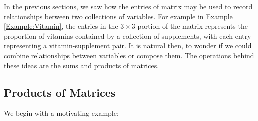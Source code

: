 In the previous sections, we saw how the entries of matrix may be used to record relationships between two collections of variables.  For example in Example \ref{Example:Vitamin}, the entries in the $3\times 3$ portion of the matrix represents the proportion of vitamins contained by a collection of supplements, with each entry representing a vitamin-supplement pair.  It is natural then, to wonder if we could combine relationships between variables or compose them.  The operations behind these ideas are the sums and products of matrices.

\subsection{Products of Matrices}

We begin with a motivating example:

